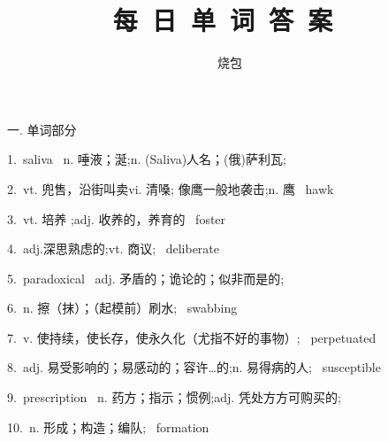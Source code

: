\documentclass[a4paper, 12pt]{article}
\begin{document}
    \noindent

    \title{ 每\ 日\ 单\ 词\ 答\ 案\  }
    \author{ 烧包 }
    \maketitle

\begin{flushleft}
一. 单词部分
\end{flushleft}

\begin{multicols}{2}
\begin{flushleft}
1.\ saliva \ n. 唾液；涎;n. (Saliva)人名；(俄)萨利瓦;
\end{flushleft}

\begin{flushleft}
2.\ vt. 兜售，沿街叫卖vi. 清嗓; 像鹰一般地袭击;n. 鹰 \ hawk
\end{flushleft}
\end{multicols}

\begin{multicols}{2}
\begin{flushleft}
3.\ vt. 培养 ;adj. 收养的，养育的 \ foster
\end{flushleft}

\begin{flushleft}
4.\ adj.深思熟虑的;vt. 商议; \ deliberate
\end{flushleft}
\end{multicols}

\begin{multicols}{2}
\begin{flushleft}
5.\ paradoxical \ adj. 矛盾的；诡论的；似非而是的;
\end{flushleft}

\begin{flushleft}
6.\ n. 擦（抹）；（起模前）刷水; \ swabbing
\end{flushleft}
\end{multicols}

\begin{multicols}{2}
\begin{flushleft}
7.\ v. 使持续，使长存，使永久化（尤指不好的事物）; \ perpetuated
\end{flushleft}

\begin{flushleft}
8.\ adj. 易受影响的；易感动的；容许…的;n. 易得病的人; \ susceptible
\end{flushleft}
\end{multicols}

\begin{multicols}{2}
\begin{flushleft}
9.\ prescription \ n. 药方；指示；惯例;adj. 凭处方方可购买的;
\end{flushleft}

\begin{flushleft}
10.\ n. 形成；构造；编队; \ formation
\end{flushleft}
\end{multicols}
\end{document}
